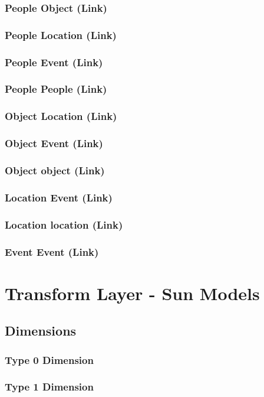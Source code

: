 \documentclass{acm_proc_article-sp}
\begin{document}
\subsubsection{People Object (Link)}
\subsubsection{People Location (Link)}
\subsubsection{People Event (Link)}
\subsubsection{People People (Link)}
\subsubsection{Object Location (Link)}
\subsubsection{Object Event (Link)}
\subsubsection{Object object (Link)}
\subsubsection{Location Event (Link)}
\subsubsection{Location location (Link)}
\subsubsection{Event Event (Link)}
\newpage
\section{Transform Layer - Sun Models}
\subsection{Dimensions}
\subsubsection{Type 0 Dimension}
\subsubsection{Type 1 Dimension}
\end{document}
